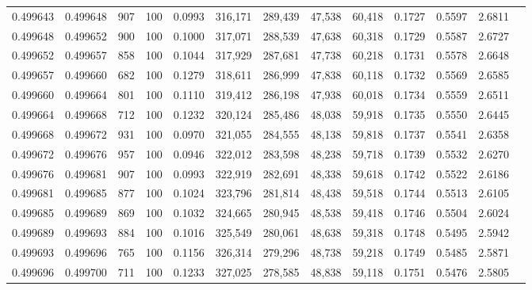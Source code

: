 \begin{tabular}{rrrrrrrrrrrrr}
0.499643 & 0.499648 &   907 & 100 &                                     0.0993 & 316,171 & 289,439 &  47,538 &  60,418 & 0.1727 & 0.5597 & 2.6811 \\
0.499648 & 0.499652 &   900 & 100 &                                     0.1000 & 317,071 & 288,539 &  47,638 &  60,318 & 0.1729 & 0.5587 & 2.6727 \\
0.499652 & 0.499657 &   858 & 100 &                                     0.1044 & 317,929 & 287,681 &  47,738 &  60,218 & 0.1731 & 0.5578 & 2.6648 \\
0.499657 & 0.499660 &   682 & 100 &                                     0.1279 & 318,611 & 286,999 &  47,838 &  60,118 & 0.1732 & 0.5569 & 2.6585 \\
0.499660 & 0.499664 &   801 & 100 &                                     0.1110 & 319,412 & 286,198 &  47,938 &  60,018 & 0.1734 & 0.5559 & 2.6511 \\
0.499664 & 0.499668 &   712 & 100 &                                     0.1232 & 320,124 & 285,486 &  48,038 &  59,918 & 0.1735 & 0.5550 & 2.6445 \\
0.499668 & 0.499672 &   931 & 100 &                                     0.0970 & 321,055 & 284,555 &  48,138 &  59,818 & 0.1737 & 0.5541 & 2.6358 \\
0.499672 & 0.499676 &   957 & 100 &                                     0.0946 & 322,012 & 283,598 &  48,238 &  59,718 & 0.1739 & 0.5532 & 2.6270 \\
0.499676 & 0.499681 &   907 & 100 &                                     0.0993 & 322,919 & 282,691 &  48,338 &  59,618 & 0.1742 & 0.5522 & 2.6186 \\
0.499681 & 0.499685 &   877 & 100 &                                     0.1024 & 323,796 & 281,814 &  48,438 &  59,518 & 0.1744 & 0.5513 & 2.6105 \\
0.499685 & 0.499689 &   869 & 100 &                                     0.1032 & 324,665 & 280,945 &  48,538 &  59,418 & 0.1746 & 0.5504 & 2.6024 \\
0.499689 & 0.499693 &   884 & 100 &                                     0.1016 & 325,549 & 280,061 &  48,638 &  59,318 & 0.1748 & 0.5495 & 2.5942 \\
0.499693 & 0.499696 &   765 & 100 &                                     0.1156 & 326,314 & 279,296 &  48,738 &  59,218 & 0.1749 & 0.5485 & 2.5871 \\
0.499696 & 0.499700 &   711 & 100 &                                     0.1233 & 327,025 & 278,585 &  48,838 &  59,118 & 0.1751 & 0.5476 & 2.5805 \\

\end{tabular}
